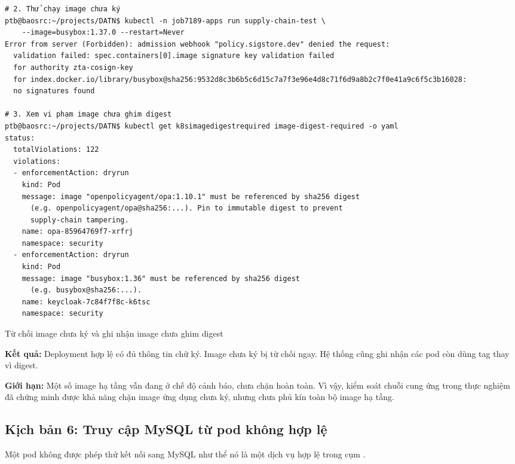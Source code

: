 \begin{listing}[H]
\begin{verbatim}
# 2. Thử chạy image chưa ký
ptb@baosrc:~/projects/DATN$ kubectl -n job7189-apps run supply-chain-test \
    --image=busybox:1.37.0 --restart=Never
Error from server (Forbidden): admission webhook "policy.sigstore.dev" denied the request:
  validation failed: spec.containers[0].image signature key validation failed
  for authority zta-cosign-key
  for index.docker.io/library/busybox@sha256:9532d8c3b6b5c6d15c7a7f3e96e4d8c71f6d9a8b2c7f0e41a9c6f5c3b16028:
  no signatures found

# 3. Xem vi phạm image chưa ghim digest
ptb@baosrc:~/projects/DATN$ kubectl get k8simagedigestrequired image-digest-required -o yaml
status:
  totalViolations: 122
  violations:
  - enforcementAction: dryrun
    kind: Pod
    message: image "openpolicyagent/opa:1.10.1" must be referenced by sha256 digest
      (e.g. openpolicyagent/opa@sha256:...). Pin to immutable digest to prevent
      supply-chain tampering.
    name: opa-85964769f7-xrfrj
    namespace: security
  - enforcementAction: dryrun
    kind: Pod
    message: image "busybox:1.36" must be referenced by sha256 digest
      (e.g. busybox@sha256:...).
    name: keycloak-7c84f7f8c-k6tsc
    namespace: security
\end{verbatim}
\caption{Từ chối image chưa ký và ghi nhận image chưa ghim digest}
\label{lst:c3_kb5b}
\end{listing}

\textbf{Kết quả:} Deployment hợp lệ có đủ thông tin chữ ký. Image chưa ký bị từ chối ngay. Hệ thống cũng ghi nhận các pod còn dùng tag thay vì digest.

\textbf{Giới hạn:} Một số image hạ tầng vẫn đang ở chế độ cảnh báo, chưa chặn hoàn toàn. Vì vậy, kiểm soát chuỗi cung ứng trong thực nghiệm đã chứng minh được khả năng chặn image ứng dụng chưa ký, nhưng chưa phủ kín toàn bộ image hạ tầng.

\subsection{Kịch bản 6: Truy cập MySQL từ pod không hợp lệ}
\label{subsec:c3_kb6}

Một pod không được phép thử kết nối sang MySQL như thể nó là một dịch vụ hợp lệ trong cụm \parencite{mitre_t1021}.

